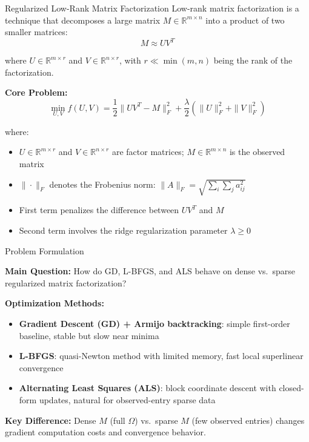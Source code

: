 \documentclass[aspectratio=169,usenames,dvipsnames]{beamer}
\newcommand{\Real}{\mathbb{R}}
\begin{document}
\begin{frame}{Regularized Low-Rank Matrix Factorization}
    Low-rank matrix factorization is a technique that decomposes a large matrix $M \in \Real^{m \times n}$ into a product of two smaller matrices:
    \[M \approx U V^T\]

where $U \in \Real^{m \times r}$ and $V \in \Real^{n \times r}$, with $r \ll \min(m, n)$ being the rank of the factorization.

\vspace{0.25cm}

\textbf{Core Problem:}
    \[
    \min_{U, V} 
    f(U, V) = \frac{1}{2}\|UV^T - M\|_F^2 + \frac{\lambda}{2}(\|U\|_F^2 + \|V\|_F^2)
    \]

    where:
\begin{itemize}
    \item $U \in \Real^{m \times r}$ and $V \in \Real^{n \times r}$ are factor matrices; $M \in \Real^{m \times n}$ is the observed matrix 
    \item $\|\cdot\|_F$ denotes the Frobenius norm: $\|A\|_F = \sqrt{\sum_{i} \sum_j a_{ij}^2}$
    \item First term penalizes the difference between $UV^T$ and $M$
    \item Second term involves the ridge regularization parameter $\lambda \geq 0$
\end{itemize}
\end{frame}

\begin{frame}{Problem Formulation}

    \textbf{Main Question:} How do GD, L-BFGS, and ALS behave on dense vs.\ sparse regularized matrix factorization?

\vspace{0.25cm}

\textbf{Optimization Methods: }
\begin{itemize}
  \item \textbf{Gradient Descent (GD) + Armijo backtracking}: simple first-order baseline, stable but slow near minima 
  \item \textbf{L-BFGS}: quasi-Newton method with limited memory, fast local superlinear convergence
  \item \textbf{Alternating Least Squares (ALS)}:  block coordinate descent with closed-form updates, natural for observed-entry sparse data
\end{itemize}

\vspace{0.2cm}

\textbf{Key Difference:} Dense $M$ (full $\Omega$) vs.\ sparse $M$ (few observed entries) changes gradient computation costs and convergence behavior.

\end{frame}
\end{document}

